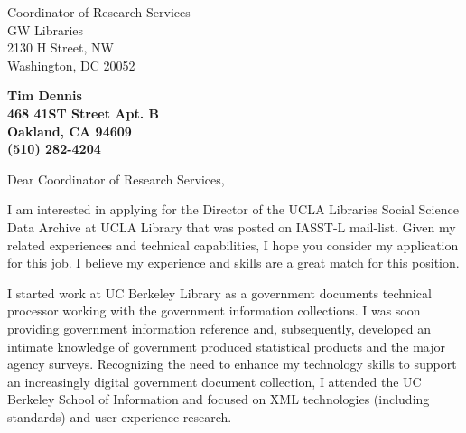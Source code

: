 \documentclass[11pt]{letter} %
\begin{document}

\begin{letter}{Coordinator of Research Services \\
GW Libraries\\
2130 H Street, NW\\
Washington, DC 20052 }


\begin{center}
\large\bf Tim Dennis \\ %
468 41ST Street Apt. B \\ Oakland, CA  94609 \\ (510) 282-4204 %
\end{center}
\vfill

\signature{Tim Dennis} %


\opening{Dear Coordinator of Research Services,}

I am interested in applying for the Director of the UCLA Libraries Social Science Data Archive at UCLA Library that was posted on IASST-L mail-list. Given my related experiences and technical capabilities, I hope you consider my application for this job. I believe my experience and skills are a great match for this position.

I started work at UC Berkeley Library as a government documents technical processor working with the government information collections. I was soon providing government information reference and, subsequently, developed an intimate knowledge of government produced statistical products and the major agency surveys. Recognizing the need to enhance my technology skills to support an increasingly digital government document collection, I attended the UC Berkeley School of Information and focused on XML technologies (including standards) and user experience research.


\end{letter}
\end{document}
